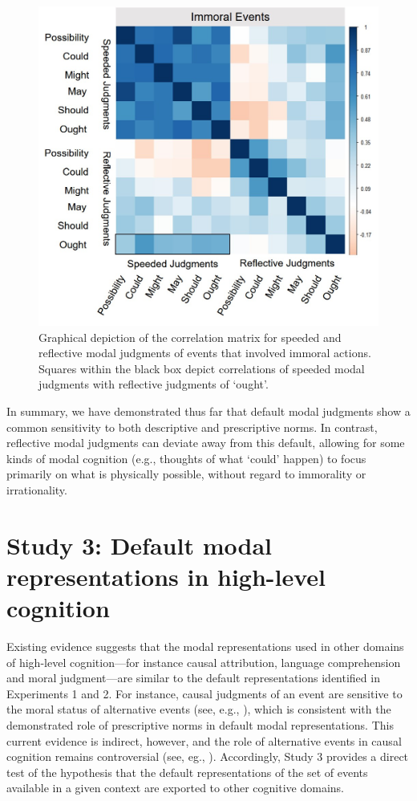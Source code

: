 \documentclass[9pt,twocolumn,twoside]{pnas-new}
\begin{document}
\begin{figure}%
\centering
\includegraphics[width=.9\linewidth]{Fig4}
\caption{Graphical depiction of the correlation matrix for speeded and reflective modal judgments of events that involved immoral actions. Squares within the black box depict correlations of speeded modal judgments with reflective judgments of `ought'.}
\label{fig:fig4}
\end{figure}

In summary, we have demonstrated thus far that default modal judgments show a common sensitivity to both descriptive and prescriptive norms. In contrast, reflective modal judgments can deviate away from this default, allowing for some kinds of modal cognition (e.g., thoughts of what `could' happen) to focus primarily on what is physically possible, without regard to immorality or irrationality.

\section*{Study 3: Default modal representations in high-level cognition}

Existing evidence suggests that the modal representations used in other domains of high-level cognition---for instance causal attribution, language comprehension and moral judgment---are similar to the default representations identified in Experiments 1 and 2. For instance, causal judgments of an event are sensitive to the moral status of alternative events (see, e.g., \citep{Hitchcock2009,halpern2015graded}), which is consistent with the demonstrated role of prescriptive norms in default modal representations. This current evidence is indirect, however, and the role of alternative events in causal cognition remains controversial (see, eg., \citep{samland2016prescriptive}). Accordingly, Study 3 provides a direct test of the hypothesis that the default representations of the set of events available in a given context are exported to other cognitive domains.
\end{document}
